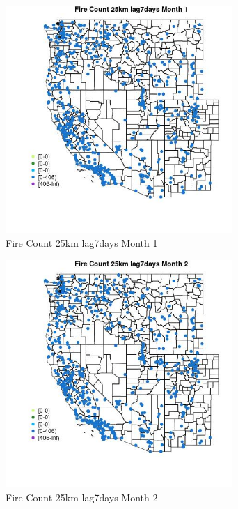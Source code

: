 \begin{figure} 
\centering  
\includegraphics[width=0.77\textwidth]{Code_Outputs/Report_ML_input_PM25_Step4_part_f_de_duplicated_aveswNAs_MapObsMo1Fire_Count_25km_lag7days.jpg} 
\caption{\label{fig:Report_ML_input_PM25_Step4_part_f_de_duplicated_aveswNAsMapObsMo1Fire_Count_25km_lag7days}Fire Count 25km lag7days Month 1} 
\end{figure} 
 

\clearpage 

\begin{figure} 
\centering  
\includegraphics[width=0.77\textwidth]{Code_Outputs/Report_ML_input_PM25_Step4_part_f_de_duplicated_aveswNAs_MapObsMo2Fire_Count_25km_lag7days.jpg} 
\caption{\label{fig:Report_ML_input_PM25_Step4_part_f_de_duplicated_aveswNAsMapObsMo2Fire_Count_25km_lag7days}Fire Count 25km lag7days Month 2} 
\end{figure} 
 

